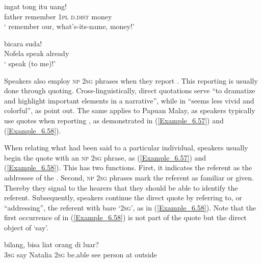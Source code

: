 \ea
\label{Example_6.55}
 {ingat} {tong} {itu} {uang!}\\ %
 father  remember  \textsc{1pl}  \textsc{d.dist}  money\\

\glt
‘ remember our, what’s-its-name, money!’ \textstyleExampleSource{[080922-001a-CvPh.0857]}
\z

\ea
\label{Example_6.56}
 {bicara} {suda!}\\ %
 Nofela  speak  already\\
\glt
‘ speak (to me)!’ \textstyleExampleSource{[080922-001a-CvPh.0805]}
\z



Speakers also employ \textsc{np} \textsc{2sg}  phrases when they report . This reporting is usually done through quoting. Cross-linguistically, direct quotations serve “to dramatize and highlight important elements in a narrative”, while in “seems less vivid and colorful”, as \citet[552]{Bublitz.2006} point out. The same applies to Papuan Malay, as speakers typically use quotes when reporting , as demonstrated in (\ref{Example_6.57}) and (\ref{Example_6.58}).



When relating what had been said to a particular individual, speakers usually begin the quote with an \textsc{np} \textsc{2sg}  phrase, as (\ref{Example_6.57}) and (\ref{Example_6.58}). This has two functions. First, it indicates the referent as the addressee of the . Second, \textsc{np} \textsc{2sg}  phrases mark the referent as familiar or given. Thereby they signal to the hearers that they should be able to identify the referent. Subsequently, speakers continue the direct quote by referring to, or “addressing”, the referent with bare  ‘\textsc{2sg}’, as in (\ref{Example_6.58}). Note that the first occurrence of  in (\ref{Example_6.58}) is not part of the quote but the direct object of  ‘say’.


\ea
\label{Example_6.57}
 {bilang,} {} {} {bisa} {liat} {orang} {di} {luar?}\\ %
 \textsc{3sg}  say  Natalia  \textsc{2sg}  be.able  see  person  at  outside\\

